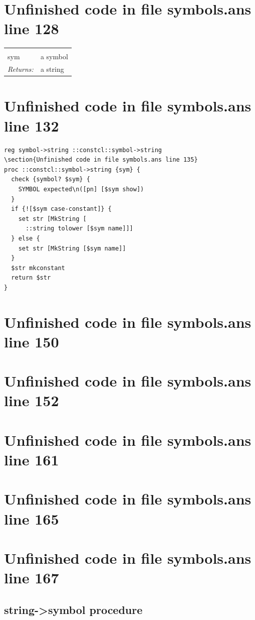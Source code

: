 \documentclass[twoside,9pt]{report}
\begin{document}
\section{Unfinished code in file symbols.ans line 128}
\noindent\begin{tabular}{ |p{1.9cm} p{8cm}| }
\hline
\rowcolor[HTML]{CCCCCC} \multicolumn{2}{|l|}{\bf symbol->string (public)} \\
sym & a symbol \\
\textit{Returns:} & a string \\
\hline
\end{tabular}
\section{Unfinished code in file symbols.ans line 132}
\begin{lstlisting}
reg symbol->string ::constcl::symbol->string
\section{Unfinished code in file symbols.ans line 135}
proc ::constcl::symbol->string {sym} {
  check {symbol? $sym} {
    SYMBOL expected\n([pn] [$sym show])
  }
  if {![$sym case-constant]} {
    set str [MkString [
      ::string tolower [$sym name]]]
  } else {
    set str [MkString [$sym name]]
  }
  $str mkconstant
  return $str
}
\end{lstlisting}
\section{Unfinished code in file symbols.ans line 150}
\section{Unfinished code in file symbols.ans line 152}
\section{Unfinished code in file symbols.ans line 161}
\section{Unfinished code in file symbols.ans line 165}
\section{Unfinished code in file symbols.ans line 167}
\subsection{string->symbol procedure}
\label{string->symbol-procedure}
\end{document}
